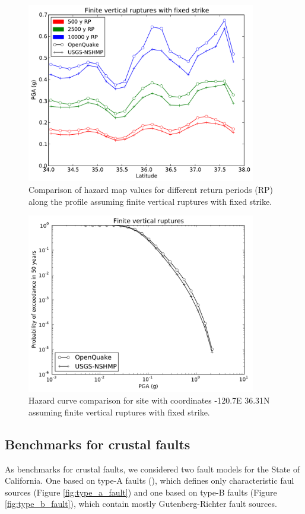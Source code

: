 \begin{figure}
\centering
\includegraphics[width=10cm]{./qareport/pictures/gridded_seismicity_oq_nshmp_fixedstrikevertical.pdf}
\caption{Comparison of hazard map values for different return periods (RP) along the profile assuming finite vertical ruptures with fixed strike.}
\label{fig:cal_grid_map_finite}
\end{figure}

\begin{figure}
\centering
\includegraphics[width=10cm]{./qareport/pictures/-120pt7_36pt31_fixedstrikevertical.pdf}
\caption{Hazard curve comparison for site with coordinates -120.7E 36.31N assuming finite vertical ruptures with fixed strike.}
\label{fig:cal_grid_curve_finite}
\end{figure}

\subsection{Benchmarks for crustal faults}
As benchmarks for crustal faults, we considered two fault models for the State of California. One based on type-A faults (\cite{petersen2008}), which defines only characteristic faul sources (Figure \ref{fig:type_a_fault}) and one based on type-B faults (Figure \ref{fig:type_b_fault}), which contain mostly Gutenberg-Richter fault sources.


